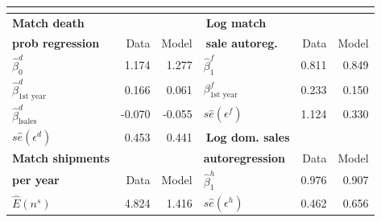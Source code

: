 \documentclass[notes=show]{beamer}
\begin{document}
\begin{frame}%


\begin{center}
{\small 
\begin{tabular}{lrrlrr}
 \multicolumn{6}{c}{} \\ \hline\hline
\textbf{Match death }                    &        &        & $\ $\textbf{Log match }          &       &       \\
\textbf{prob regression}                 & Data   & Model  & $\ $\textbf{sale autoreg.}       & Data  & Model \\ \hline
$\widehat{\beta }_{0}^{d}$               & 1.174  & 1.277  & $\widehat{\beta }_{1}^{f}$       & 0.811 & 0.849 \\
$\widehat{\beta }_{\mbox{1st year}}^{d}$ & 0.166  & 0.061  & $\beta _{\mbox{1st year}}^{f}$ & 0.233 & 0.150 \\
$\widehat{\beta }_{\mbox{lsales}}^{d}$   & -0.070 & -0.055 & $s\widehat{e} (\epsilon ^{f})$   & 1.124 & 0.330 \\
$s\widehat{e}(\epsilon ^{d})$            & 0.453  & 0.441  & $\ $\textbf{Log dom. sales }     &       &       \\
\textbf{Match shipments }                &        &        & \textbf{autoregression}          & Data  & Model \\ \cline{4-6}
\textbf{per year}                        & Data   & Model  & $\widehat{\beta }_{1}^{h}$       & 0.976 & 0.907 \\ \cline{1-3}
$\widehat{E}\left( n^{s}\right) $        & 4.824  & 1.416  & $s\widehat{e}(\epsilon ^{h})$    & 0.462 & 0.656 \\ \hline
\end{tabular}%
}{\tiny \ }
\end{center}

\end{frame}%
\end{document}
